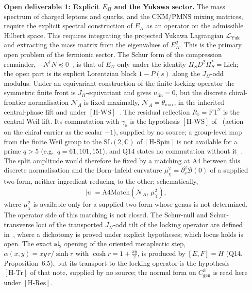 \documentclass[11pt,a4paper]{article}
\theoremstyle{definition}
\newcommand{\SL}{\mathrm{SL}}
\newcommand{\Epi}{E_\Pi}
\newcommand{\Cgen}{C^3_{\mathrm{gen}}}
\newcommand{\HSpin}{\ensuremath{[\mathrm{H\text{-}Spin}]}}
\newcommand{\HRes}{\ensuremath{[\mathrm{H\text{-}Res}]}}
\newcommand{\HTr}{\ensuremath{[\mathrm{H\text{-}Tr}]}}
\newcommand{\HWS}{\ensuremath{[\mathrm{H\text{-}WS}]}}
\newcommand{\LYuk}{\mathcal{L}_{\mathrm{Yuk}}}
\begin{document}
    \textbf{Open deliverable 1: Explicit $\Epi$ and the Yukawa sector.}
    The mass spectrum of charged leptons and quarks, and the CKM/PMNS mixing matrices,
    require the explicit spectral construction of $\Epi$ as an operator on the admissible
    Hilbert space.
    This requires integrating the projected Yukawa Lagrangian $\LYuk$ and
    extracting the mass matrix from the eigenvalues of $\Epi^2$.
    This is the primary open problem of the fermionic sector.
    The Schur form of the compression remainder, $-N^{\dagger}N\preceq0$~\cite{Beau2026prs}, is that of $\Epi$ only under
    the identity $\Pi_S D^2\Pi_S^{*}=\mathrm{Lich}$;
    the open part is its explicit Lorentzian block $1-P(s)$ along the $J_\Pi$-odd modulus.
    Under an equivariant construction of the finite locking operator the symmetric finite front is $J_\Pi$-equivariant
    and gives $u_{\mathrm{fin}}=0$, but the discrete
    chiral-frontier normalisation $\mathcal N_A$ is fixed maximally, $\mathcal N_A=\theta_{\max}$, in the
    inherited central-phase lift and under \HWS{}~\cite{Beau2026cho}.
    The residual reflection $R_b=\mathrm{FT}^2$ is the central Weil lift.
    Its commutation with $\gamma_5$ is the hypothesis \HWS{} of~\cite{Beau2026q11of} (action on the chiral
    carrier as the scalar $-1$), supplied by no source; a group-level map from the finite Weil group to the
    $\SL(2,\mathbb{C})$ of \HSpin{} is not available for a prime $q>5$ (e.g.\ $q=61,101,151$), and Q14 states no commutation without it~\cite{Beau2026q14}.
    The split amplitude would therefore be fixed by a matching at A4 between this discrete normalisation and the
    Born--Infeld curvature $\mu_\chi^2=\partial_s^2\mathcal B(0)$ of a supplied two-form, neither ingredient reducing
    to the other; schematically,
    \[
      |u| = \mathrm{A4Match}\!\left(\mathcal N_A,\,\mu_\chi^2\right),
    \]
    where $\mu_\chi^2$ is available only for a supplied two-form whose genus is not determined.
    The operator side of this matching is not closed.
    The Schur-null and Schur-transverse loci of the transported $J_\Pi$-odd tilt of the locking operator are defined
    in~\cite{Beau2026prs}, where a dichotomy is proved under explicit hypotheses; which locus holds is open.
    The exact $\mathfrak{sl}_2$ opening of the oriented metaplectic step, $\alpha(x,y)=xy\,r/\sinh r$ with
    $\cosh r=1+\tfrac{xy}{2}$, is produced by $[E,F]=H$ (Q14, Proposition~6.5), but its transport to the locking
    operator is the hypothesis \HTr{} of that note, supplied by no source; the normal form on $\Cgen$ is read here under
    \HRes{}.
\end{document}
